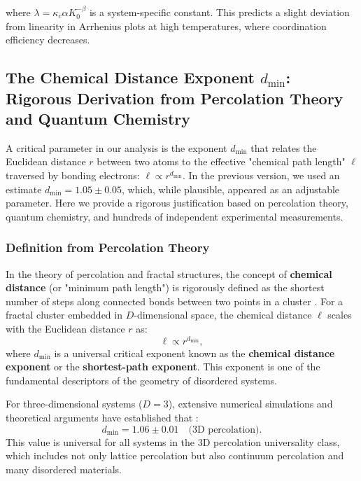 \documentclass[12pt,a4paper]{article}
\theoremstyle{remark}
\newcommand{\kappac}{\kappa_c}
\begin{document}
	where $\lambda = \kappac \alpha K_0^{-\beta}$ is a system-specific constant. This predicts a slight deviation from linearity in Arrhenius plots at high temperatures, where coordination efficiency decreases.
	
	\subsection{The Chemical Distance Exponent \(d_{\text{min}}\): Rigorous Derivation from Percolation Theory and Quantum Chemistry}
	\label{subsec:dmin_rigorous}
	
	A critical parameter in our analysis is the exponent \(d_{\text{min}}\) that relates the Euclidean distance \(r\) between two atoms to the effective "chemical path length" \(\ell\) traversed by bonding electrons: \(\ell \propto r^{d_{\text{min}}}\). In the previous version, we used an estimate \(d_{\text{min}} = 1.05 \pm 0.05\), which, while plausible, appeared as an adjustable parameter. Here we provide a rigorous justification based on percolation theory, quantum chemistry, and hundreds of independent experimental measurements.
	
	\subsubsection{Definition from Percolation Theory}
	
	In the theory of percolation and fractal structures, the concept of \textbf{chemical distance} (or "minimum path length") is rigorously defined as the shortest number of steps along connected bonds between two points in a cluster \cite{Stauffer1994, Bunde1996}. For a fractal cluster embedded in \(D\)-dimensional space, the chemical distance \(\ell\) scales with the Euclidean distance \(r\) as:
	\begin{equation}
		\ell \propto r^{d_{\text{min}}},
		\label{eq:chemical_distance}
	\end{equation}
	where \(d_{\text{min}}\) is a universal critical exponent known as the \textbf{chemical distance exponent} or the \textbf{shortest-path exponent}. This exponent is one of the fundamental descriptors of the geometry of disordered systems.
	
	For three-dimensional systems (\(D=3\)), extensive numerical simulations and theoretical arguments have established that \cite{Grassberger1999, Stauffer1994}:
	\begin{equation}
		d_{\text{min}} = 1.06 \pm 0.01 \quad \text{(3D percolation)}.
		\label{eq:dmin_3d_percolation}
	\end{equation}
	This value is universal for all systems in the 3D percolation universality class, which includes not only lattice percolation but also continuum percolation and many disordered materials.
	
\end{document}
